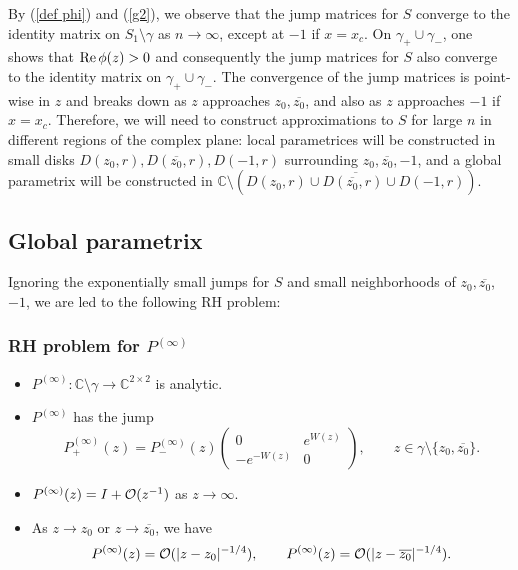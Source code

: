\documentclass[11pt,fleqn]{article}
\numberwithin{equation}{section}
\def\Re{{\rm Re \,}}
\def\bigO{{\cal O}}
\begin{document}
By (\ref{def phi}) and (\ref{g2}), we observe that the jump matrices for $S$ converge to the identity matrix on $S_{1}\setminus \gamma$ as $n\to\infty$, except at $-1$ if $x=x_c$.
On $\gamma_{+} \cup \gamma_{-}$, one shows that $\Re\phi(z)>0$ and consequently the jump matrices for $S$ also converge to the identity matrix on $\gamma_{+} \cup \gamma_{-}$.
The convergence of the jump matrices is point-wise in $z$ and breaks down as $z$ approaches $z_0, \overline{z_0}$, and also as $z$ approaches $-1$ if $x=x_c$. Therefore, we will need to construct approximations to $S$ for large $n$ in different regions of the complex plane: local parametrices will be constructed in small disks $D(z_0,r), D(\overline{z_0},r), D(-1,r)$ surrounding $z_0, \overline{z_0}, -1$, and a global parametrix will be constructed in $\mathbb C\setminus(\overline{D(z_0,r)\cup D(\overline{z_{0}},r)\cup D(-1,r)})$.

\subsection{Global parametrix}
Ignoring the exponentially small jumps for $S$ and small neighborhoods of $z_0, \overline{z_0}$, $-1$, we are led to the following RH problem:
\subsubsection*{RH problem for $P^{(\infty)}$}
\begin{itemize}
\item[(a)] $P^{(\infty)} : \mathbb{C}\setminus \gamma \to \mathbb{C}^{2\times 2}$ is analytic.
\item[(b)] $P^{(\infty)}$ has the jump
\begin{equation}\label{jump Pinfty}
P^{(\infty)}_+(z)=P^{(\infty)}_-(z)\begin{pmatrix} 0&e^{W(z)}\\-e^{-W(z)}&0
\end{pmatrix},\qquad z\in\gamma\setminus\{z_{0},\overline{z_{0}}\}.
\end{equation}
\item[(c)] $P^{(\infty)}(z) = I + \bigO(z^{-1})$ as $z \to \infty$.
\item[(d)] As $z\to z_0$ or $z\to \overline{z_0}$, we have
\begin{equation}
P^{(\infty)}(z)=\bigO(|z-z_0|^{-1/4}),\qquad P^{(\infty)}(z)=\bigO(|z-\overline{z_0}|^{-1/4}).
\end{equation}
\end{itemize}
\end{document}
